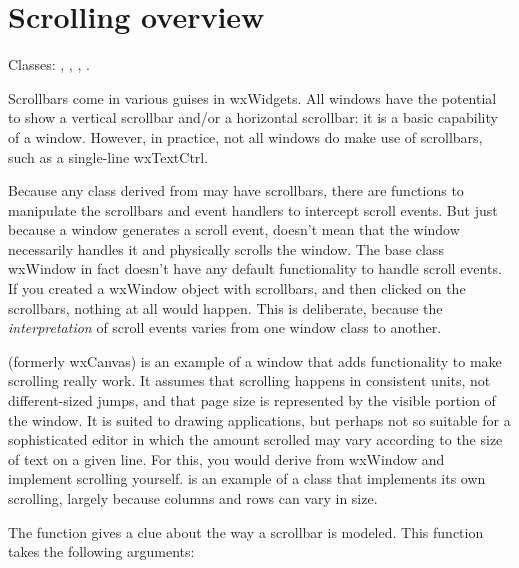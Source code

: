 \section{Scrolling overview}\label{scrollingoverview}

Classes: , , , .

Scrollbars come in various guises in wxWidgets. All windows have the potential
to show a vertical scrollbar and/or a horizontal scrollbar: it is a basic capability of a window.
However, in practice, not all windows do make use of scrollbars, such as a single-line wxTextCtrl.

Because any class derived from   may have scrollbars,
there are functions to manipulate the scrollbars and event handlers to intercept
scroll events. But just because a window generates a scroll event, doesn't mean
that the window necessarily handles it and physically scrolls the window. The base class
wxWindow in fact doesn't have any default functionality to handle scroll events.
If you created a wxWindow object with scrollbars, and then clicked on the scrollbars, nothing
at all would happen. This is deliberate, because the {\it interpretation} of scroll
events varies from one window class to another.

 (formerly wxCanvas) is an example of a window that
adds functionality to make scrolling really work. It assumes that scrolling happens in
consistent units, not different-sized jumps, and that page size is represented
by the visible portion of the window. It is suited to drawing applications, but perhaps
not so suitable for a sophisticated editor in which the amount scrolled may vary according
to the size of text on a given line. For this, you would derive from wxWindow and
implement scrolling yourself.  is an example of a class
that implements its own scrolling, largely because columns and rows can vary in size.


The function  gives a clue about
the way a scrollbar is modeled. This function takes the following arguments:

\twocolwidtha{5cm}%
\begin{twocollist}
\end{twocollist}%

